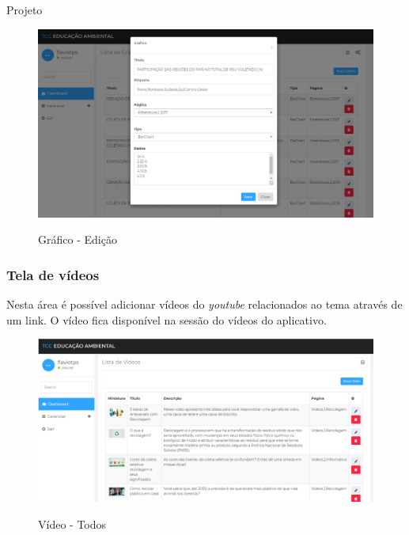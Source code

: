 \documentclass[
	12pt,				%
	openright,			%
	twoside,			%
	a4paper,			%
	english,			%
	french,				%
	spanish,			%
	brazil				%
	]{abntex2}
\begin{document}
\begin{chapter}{Projeto}
\begin{figure}[h]
\centering
   \caption{Gráfico - Edição}
   \includegraphics[scale=0.40]{media/tela_graficos_site_2.png}
     \label{fig:tela_graficos_site_2}
\end{figure}

\newpage
\subsubsection{Tela de vídeos} \label{tela_video}
Nesta área é possível adicionar vídeos do \textit{youtube} relacionados ao tema através de um link. O vídeo fica disponível na sessão do vídeos do aplicativo.

\begin{figure}[h]
\centering
   \caption{Vídeo - Todos}
   \includegraphics[scale=0.40]{media/tela_video_site_1.png}
     \label{fig:tela_video_site_1}
\end{figure}


\end{chapter}
\end{document}

